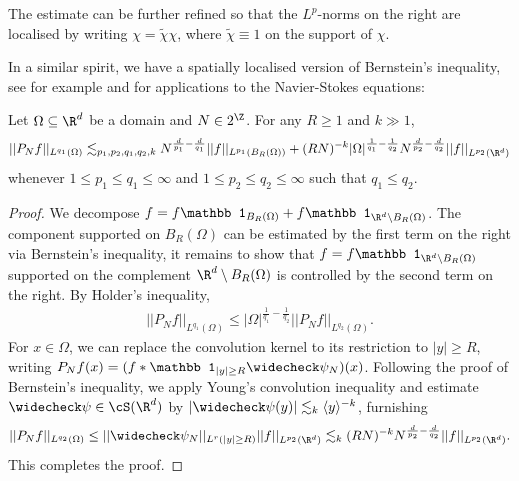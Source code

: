 \begin{remark}
	The estimate can be further refined so that the $L^p$-norms on the right are localised by writing $\chi = \widetilde \chi \chi$, where $\widetilde \chi \equiv 1$ on the support of $\chi$. 
\end{remark}

In a similar spirit, we have a spatially localised version of Bernstein's inequality, see for example \cite{Tao2020} and \cite{Palasek2022} for applications to the Navier-Stokes equations: 

\begin{proposition}
	Let $\Omega \subseteq \R^d$ be a domain and $N \in 2^\Z$. For any $R \geq 1$ and $k \gg 1$, 
		\[ || P_N f ||_{L^{q_1} (\Omega)} \lesssim_{p_1, p_2, q_1, q_2, k} N^{\frac{d}{p_1} - \frac{d}{q_1}} ||f||_{L^{p_1} (B_R (\Omega))} + (RN)^{-k} |\Omega|^{\frac{1}{q_1} - \frac{1}{q_2}} N^{\frac{d}{p_2} - \frac{d}{q_2}} ||f||_{L^{p_2} (\R^d)}  \]
	whenever $1 \leq p_1 \leq q_1 \leq \infty$ and $1 \leq p_2 \leq q_2 \leq \infty$ such that $q_1 \leq q_2$. 
\end{proposition}

\begin{proof}
	We decompose $f = f \mathbb 1_{B_R (\Omega)} + f \mathbb 1_{\R^d \setminus B_R (\Omega)}$. The component supported on $B_R (\Omega)$ can be estimated by the first term on the right via Bernstein's inequality, it remains to show that $f =  f \mathbb 1_{\R^d \setminus B_R (\Omega)}$ supported on the complement $\R^d \setminus B_R (\Omega)$ is controlled by the second term on the right. By Holder's inequality, 
		\begin{align*}
			|| P_N f ||_{L^{q_1} (\Omega)} \leq |\Omega|^{\frac{1}{q_1} - \frac{1}{q_2}} || P_N f||_{L^{q_2} (\Omega)}. 
		\end{align*}
	For $x \in \Omega$, we can replace the convolution kernel to its restriction to $|y| \geq R$, writing $P_N f(x) = (f * \mathbb 1_{|y| \geq R}\widecheck \psi_N) (x)$. Following the proof of Bernstein's inequality, we apply Young's convolution inequality and estimate $\widecheck \psi \in \cS (\R^d)$ by $|\widecheck \psi (y)| \lesssim_k \langle y \rangle^{-k}$, furnishing
		\[ ||P_N f||_{L^{q_2} (\Omega)} \leq  ||\widecheck \psi_N||_{L^r (|y| \geq R)} ||f||_{L^{p_2} (\R^d)} \lesssim_k (RN)^{-k} N^{\frac{d}{p_2} - \frac{d}{q_2}} ||f||_{L^{p_2} (\R^d)}.  \]
	This completes the proof. 
\end{proof}

